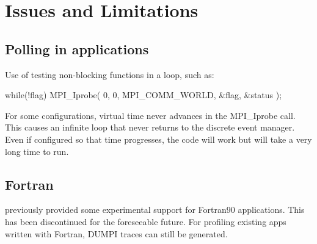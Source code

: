 
\chapter{Issues and Limitations}
\section{Polling in applications}

Use of testing non-blocking functions in a loop, such as:


\begin{CppCode}
while(!flag){
 MPI_Iprobe( 0, 0, MPI_COMM_WORLD, &flag, &status );
}
\end{CppCode}

For some configurations, virtual time never advances in the MPI\_Iprobe call. 
This causes an infinite loop that never returns to the discrete event manager. 
Even if configured so that time progresses, the code will work but will take a very long time to run.

\section{Fortran}
\label{subsec:issues:fortran}

\sstmacro previously provided some experimental support for Fortran90 applications. 
This has been discontinued for the foreseeable future.
For profiling existing apps written with Fortran, DUMPI traces can still be generated. 




